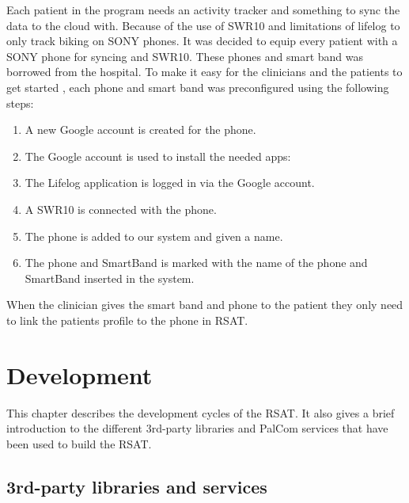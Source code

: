 \documentclass{cslthse-msc}
\begin{document}
Each patient in the program needs an activity tracker and something to sync the data to the cloud with. Because of the use of SWR10 and limitations of lifelog to only track biking on SONY phones. It was decided to equip every patient with a SONY phone for syncing and SWR10. These phones and smart band was borrowed from the hospital. To make it easy for the clinicians and the patients to get started , each phone and smart band was preconfigured using the following steps:

\begin{enumerate}
    \item{A new Google account is created for the phone.}
    \item{The Google account is used to install the needed apps:
}
    \item{The Lifelog application is logged in via the Google account.}
   \item{A SWR10 is connected with the phone.}
    \item{The phone is added to our system and given a name.}
    \item{The phone and SmartBand is marked with the name of the phone and SmartBand inserted in the system.}
\end{enumerate}

When the clinician gives the smart band and phone to the patient they only need to link the patients profile to the phone in RSAT. %


\chapter{Development}
This chapter describes the development cycles of the RSAT. It also gives a brief introduction to the different 3rd-party libraries and PalCom services that have been used to build the RSAT.

\section{3rd-party libraries and services}
\end{document}
